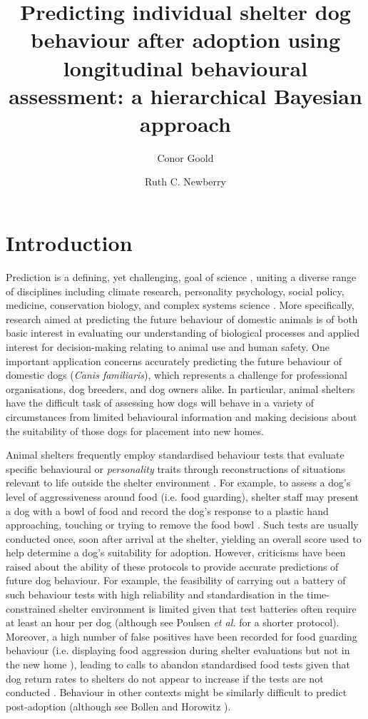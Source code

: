 \documentclass[fleqn,10pt]{wlscirep}
\title{Predicting individual shelter dog behaviour after adoption using longitudinal behavioural assessment: a hierarchical Bayesian approach}
\author[1,2]{Conor Goold}
\author[2*]{Ruth C. Newberry}
\affil[1]{School of Biology, Faculty of Biological Sciences, University of Leeds, Leeds, LS2 9JT, UK}
\affil[2]{Department of Animal and Aquacultural Sciences, Faculty of Biosciences, Norwegian University of Life Sciences, Aas, 1400, Norway}
\affil[*]{ruth.newberry@nmbu.no}
\begin{document}
\flushbottom
\maketitle
\thispagestyle{empty}

\section*{Introduction}
Prediction is a defining, yet challenging, goal of science \cite{hofstadter1951}, uniting a diverse range of disciplines including climate research, personality psychology, social policy, medicine, conservation biology, and complex systems science \cite{sarewitz1999}. More specifically, research aimed at predicting the future behaviour of domestic animals is of both basic interest in evaluating our understanding of biological processes and applied interest for decision-making relating to animal use and human safety. One important application concerns accurately predicting the future behaviour of domestic dogs (\textit{Canis familiaris}), which represents a challenge for professional organisations, dog breeders, and dog owners alike. In particular, animal shelters have the difficult task of assessing how dogs will behave in a variety of circumstances from limited behavioural information and making decisions about the suitability of those dogs for placement into new homes.

Animal shelters frequently employ standardised behaviour tests that evaluate specific behavioural or \textit{personality} traits through reconstructions of situations relevant to life outside the shelter environment \cite{vanderborg1991,marston2003,mornement2010,taylor2006,rayment2015,clay2020behaviour}. For example, to assess a dog's level of aggressiveness around food (i.e. food guarding), shelter staff may present a dog with a bowl of food and record the dog's response to a plastic hand approaching, touching or trying to remove the food bowl \cite{mohangibbons2012,mohangibbons2018,marder2013}. Such tests are usually conducted once, soon after arrival at the shelter, yielding an overall score used to help determine a dog's suitability for adoption. However, criticisms have been raised about the ability of these protocols to provide accurate predictions of future dog behaviour. For example, the feasibility of carrying out a battery of such behaviour tests with high reliability and standardisation in the time-constrained shelter environment is limited given that test batteries often require at least an hour per dog \cite{vanderborg1991,mornement2009} (although see Poulsen \textit{et al.} \cite{poulsen2010} for a shorter protocol). Moreover, a high number of false positives have been recorded for food guarding behaviour (i.e. displaying food aggression during shelter evaluations but not in the new home \cite{mohangibbons2012,marder2013}), leading to calls to abandon standardised food tests given that dog return rates to shelters do not appear to increase if the tests are not conducted \cite{mohangibbons2018}. Behaviour in other contexts might be similarly difficult to predict post-adoption \cite{christensen2007,mornement2015} (although see Bollen and Horowitz \cite{bollen2008}).
\end{document}
